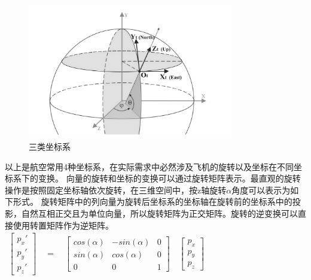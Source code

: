 \begin{itemize}
\begin{figure}[h!]
        \begin{center}
            \includegraphics[width=0.8\textwidth]{pictures/coord.png}
            \caption{三类坐标系}
            \label{crood2}
        \end{center}
    \end{figure}
\end{itemize}
\par
以上是航空常用4种坐标系，在实际需求中必然涉及飞机的旋转以及坐标在不同坐标系下的变换。
向量的旋转和坐标的变换可以通过旋转矩阵表示\cite{rotate1}。最直观的旋转操作是按照固定坐标轴依次旋转，在三维空间中，按z轴旋转$\alpha$角度可以表示为如下形式。
旋转矩阵中的列向量为旋转后坐标系的坐标轴在旋转前的坐标系中的投影，自然互相正交且为单位向量，所以旋转矩阵为正交矩阵。旋转的逆变换可以直接使用转置矩阵作为逆矩阵。
~\\

\begin{math} 
    \begin{gathered}
        \begin{bmatrix} p_x' \\ p_y' \\ p_z'\end{bmatrix} 
        \quad 
        =
        \quad
        \begin{bmatrix} 
            cos(α) & -sin(α) & 0 \\
            sin(α) & cos(α) & 0 \\ 
            0 & 0 & 1
        \end{bmatrix}
        \quad
        \begin{bmatrix} p_x\\ p_y \\ p_z \end{bmatrix}
    \end{gathered}
\end{math}

